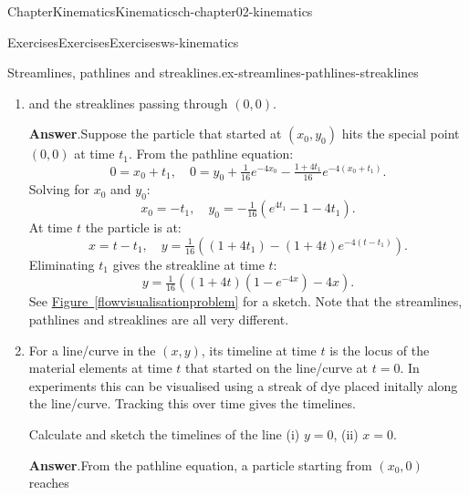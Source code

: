 \documentclass[oneside,10pt,]{book}
\newcommand{\blocktitlefont}{\relax}
\newcommand{\xreffont}{\relax}
\numberwithin{equation}{section}
\begin{document}
\begin{chapterptx}{Chapter}{Kinematics}{}{Kinematics}{}{}{ch-chapter02-kinematics}
\begin{exercises-section}{Exercises}{Exercises}{}{Exercises}{}{}{ws-kinematics}
\begin{divisionexercise}{6}{Streamlines, pathlines and streaklines.}{}{ex-streamlines-pathlines-streaklines}
\begin{enumerate}[font=\bfseries,label=(\alph*),ref=\alph*]
\begin{equation*}
\end{equation*}
This is a general pathline. For the particular particle that starts from \((0,0)\):%
\begin{equation*}
y = \tfrac{1}{16}\left(1 - (1+4x)e^{-4x}\right).
\end{equation*}
See \hyperref[flowvisualisationproblem]{Figure~{\xreffont\ref{flowvisualisationproblem}}} for a sketch.%
\item{}and the streaklines passing through \((0,0)\).%
\par\smallskip%
\noindent\textbf{\blocktitlefont Answer}.\hypertarget{ex-streamlines-pathlines-streaklines-5-2}{}\quad{}Suppose the particle that started at \((x_0,y_0)\) hits the special point \((0,0)\) at time \(t_1\). From the pathline equation:%
\begin{equation*}
0 = x_0 + t_1, \quad
0 = y_0 + \tfrac{1}{16} e^{-4x_0}
- \tfrac{1+4t_1}{16} e^{-4(x_0+t_1)}.
\end{equation*}
Solving for \(x_0\) and \(y_0\):%
\begin{equation*}
x_0 = -t_1,\quad
y_0 = -\tfrac{1}{16}\left(e^{4t_1} - 1 - 4t_1\right).
\end{equation*}
At time \(t\) the particle is at:%
\begin{equation*}
x = t - t_1,\quad
y = \tfrac{1}{16}\left((1+4t_1) - (1+4t)e^{-4(t-t_1)}\right).
\end{equation*}
Eliminating \(t_1\) gives the streakline at time \(t\):%
\begin{equation*}
y = \tfrac{1}{16}\left((1+4t)(1-e^{-4x}) - 4x\right).
\end{equation*}
See \hyperref[flowvisualisationproblem]{Figure~{\xreffont\ref{flowvisualisationproblem}}} for a sketch. Note that the streamlines, pathlines and streaklines are all very different.%
\item{}For a line\slash{}curve in the \((x,y)\), its timeline at time \(t\) is the locus of the material elements at time \(t\) that started on the line\slash{}curve at \(t=0\). In experiments this can be visualised using a streak of dye placed initally along the line\slash{}curve. Tracking this over time gives the timelines.%
\par
Calculate and sketch the timelines of the line (i) \(y=0\), (ii) \(x=0\).%
\par\smallskip%
\noindent\textbf{\blocktitlefont Answer}.\hypertarget{ex-streamlines-pathlines-streaklines-6-2}{}\quad{}From the pathline equation, a particle starting from \((x_0,0)\) reaches%
\begin{equation*}

\end{equation*}
\end{enumerate}
\end{divisionexercise}
\end{exercises-section}
\end{chapterptx}
\end{document}
